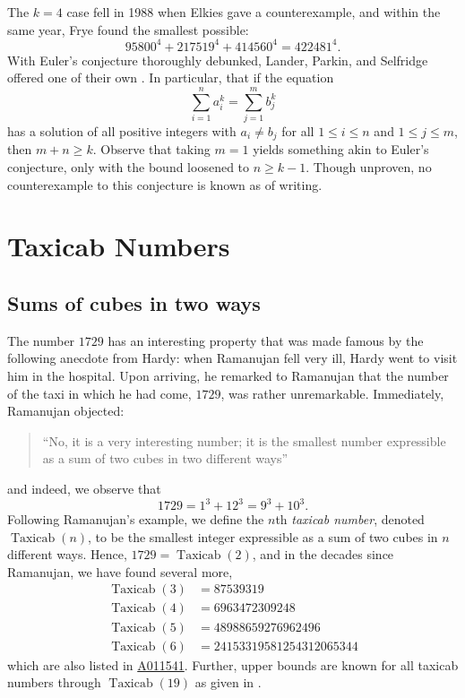 \documentclass[11pt]{amsart}
\begin{document}
The $k = 4$ case fell in 1988 when Elkies gave a counterexample, and within the same year, Frye found the smallest possible:
\begin{equation*}
  95800^4 + 217519^4 + 414560^4 = 422481^4.
\end{equation*}
With Euler's conjecture thoroughly debunked, Lander, Parkin, and Selfridge offered one of their own \cite{LPS67}. In particular, that if the equation
\begin{equation*}
  \sum_{i = 1}^n a_i^k = \sum_{j = 1}^m b_j^k
\end{equation*}
has a solution of all positive integers with $a_i \neq b_j$ for all $1 \leq i \leq n$ and $1 \leq j \leq m$, then $m + n \geq k$. Observe that taking $m = 1$ yields something akin to Euler's conjecture, only with the bound loosened to $n \geq k - 1$. Though unproven, no counterexample to this conjecture is known as of writing.


\section{Taxicab Numbers}
\subsection{Sums of cubes in two ways}
The number $1729$ has an interesting property that was made famous by the following anecdote from Hardy: when Ramanujan fell very ill, Hardy went to visit him in the hospital. Upon arriving, he remarked to Ramanujan that the number of the taxi in which he had come, $1729$, was rather unremarkable. Immediately, Ramanujan objected:
\begin{quotation}
  ``No, it is a very interesting number; it is the smallest number expressible as a sum of two cubes in two different ways''
\end{quotation}
and indeed, we observe that
\begin{equation*}
  1729 = 1^3 + 12^3 = 9^3 + 10^3.
\end{equation*}
Following Ramanujan's example, we define the $n$th \emph{taxicab number}, denoted $\operatorname{Taxicab}(n)$, to be the smallest integer expressible as a sum of two cubes in $n$ different ways. Hence, $1729 = \operatorname{Taxicab}(2)$, and in the decades since Ramanujan, we have found several more,
\begin{align*}
  \operatorname{Taxicab}(3) &= 87539319 \\
  \operatorname{Taxicab}(4) &= 6963472309248 \\
  \operatorname{Taxicab}(5) &= 48988659276962496 \\
  \operatorname{Taxicab}(6) &= 24153319581254312065344
\end{align*}
which are also listed in \href{https://oeis.org/A011541}{A011541}. Further, upper bounds are known for all taxicab numbers through $\operatorname{Taxicab}(19)$ as given in \cite{Boy08}.
\end{document}
